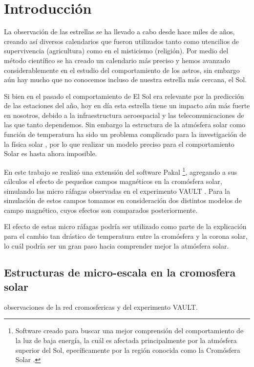 \documentclass[9pt]{book}
\begin{document}
  \renewcommand{\thepage}{\arabic{page}}
  \setcounter{page}{1}
  \renewcommand{\tablename}{Tabla}

 \chapter{Introducci\'on}

La observaci\'on de las estrellas se ha llevado a cabo desde hace miles de a\~nos, creando as\'i diversos calendarios que fueron utilizados tanto como utencilios de supervivencia (agricultura) como en el misticismo (religi\'on). Por medio del m\'etodo cient\'ifico se ha creado un calendario m\'as preciso y hemos avanzado considerablemente en el estudio del comportamiento de los astros, sin embargo a\'un hay mucho que no conocemos incluso de nuestra estrella m\'as cercana, el Sol.

Si bien en el pasado el comportamiento de El Sol era relevante por la predicci\'on de las estaciones del a\~no, hoy en d\'ia esta estrella tiene un impacto a\'un m\'as fuerte en nosotros, debido a la infraestructura aeroespacial y las telecomunicaciones de las que tanto dependemos. Sin embargo la estructura de la atm\'osfera solar como funci\'on de temperatura ha sido un problema complicado para la investigaci\'on de la f\'isica solar , por lo que realizar un modelo preciso para el comportamiento Solar es hasta ahora imposible.

En este trabajo se realiz\'o una extensi\'on del software Pakal \footnote{Software creado para buscar una mejor comprensi\'on del comportamiento de la luz de baja energ\'ia, la cu\'al es afectada principalmente por la atm\'osfera superior del Sol, epec\'ificamente por la regi\'on conocida como la Crom\'osfera Solar .}, agregando a sus c\'alculos el efecto de peque\~nos campos magn\'eticos en la crom\'osfera solar, simulando las micro r\'afagas observadas en el experimento VAULT . Para la simulaci\'on de estos campos tomamos en consideraci\'on dos distintos modelos de campo magn\'etico, cuyos efectos son comparados posteriormente.

El efecto de estas micro r\'afagas podr\'ia ser utilizado como parte de la explicaci\'on para el cambio tan dr\'astico de temperatura entre la crom\'osfera y la corona solar, lo cu\'al podr\'ia ser un gran paso hacia comprender mejor la atm\'osfera solar.


\section{Estructuras de micro-escala en la cromosfera solar}
observaciones de la red cromosfericas y del experimento VAULT.
\end{document}
